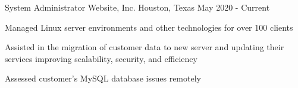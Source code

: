     \begin{cventries}

          \cventry
            {System Administrator} %
            {Website, Inc.} %
            {Houston, Texas} %
            {May 2020 - Current} %
            {
              \begin{cvitems} %
                \item {Managed Linux server environments and other technologies for over 100 clients}
                \item {Assisted in the migration of customer data to new server and updating their services improving scalability, security, and efficiency}
                \item {Assessed customer's MySQL database issues remotely }
              \end{cvitems}
            }




\end{cventries}
